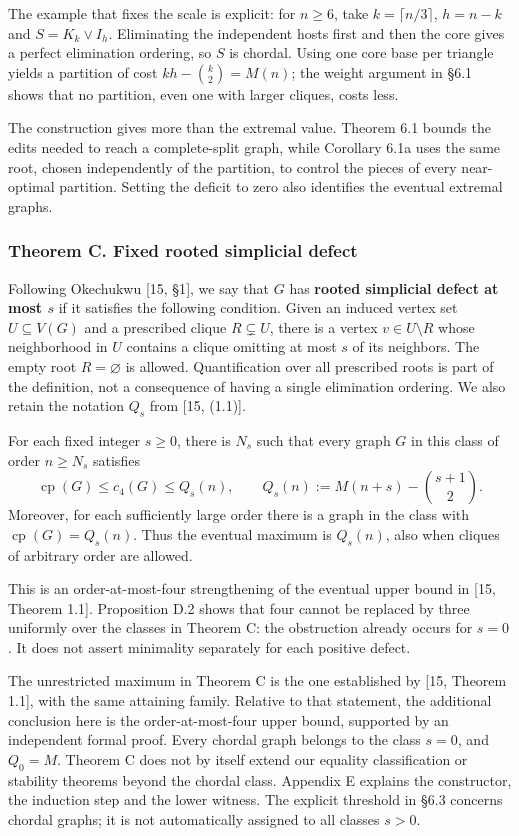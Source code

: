 \documentclass[english,11pt,a4paper]{article}
\begin{document}
The example that fixes the scale is explicit: for \(n\ge6\), take \(k=\lceil n/3\rceil\), \(h=n-k\) and \(S=K_k\vee I_h\). Eliminating the independent hosts first and then the core gives a perfect elimination ordering, so \(S\) is chordal. Using one core base per triangle yields a partition of cost \(kh-\binom k2=M(n)\); the weight argument in §6.1 shows that no partition, even one with larger cliques, costs less.

The construction gives more than the extremal value. Theorem 6.1 bounds the edits needed to reach a complete-split graph, while Corollary 6.1a uses the same root, chosen independently of the partition, to control the pieces of every near-optimal partition. Setting the deficit to zero also identifies the eventual extremal graphs.

\subsubsection{Theorem C. Fixed rooted simplicial defect}\label{theorem-c.-fixed-rooted-simplicial-defect}

Following Okechukwu {[}15, §1{]}, we say that \(G\) has \textbf{rooted simplicial defect at most \(s\)} if it satisfies the following condition. Given an induced vertex set \(U\subseteq V(G)\) and a prescribed clique \(R\subsetneq U\), there is a vertex \(v\in U\setminus R\) whose neighborhood in \(U\) contains a clique omitting at most \(s\) of its neighbors. The empty root \(R=\varnothing\) is allowed. Quantification over all prescribed roots is part of the definition, not a consequence of having a single elimination ordering. We also retain the notation \(Q_s\) from {[}15, (1.1){]}.

For each fixed integer \(s\ge0\), there is \(N_s\) such that every graph \(G\) in this class of order \(n\ge N_s\) satisfies \[
\operatorname{cp}(G)\le c_4(G)\le Q_s(n),
\qquad
Q_s(n):=M(n+s)-\binom{s+1}{2}.
\tag{C}
\] Moreover, for each sufficiently large order there is a graph in the class with \(\operatorname{cp}(G)=Q_s(n)\). Thus the eventual maximum is \(Q_s(n)\), also when cliques of arbitrary order are allowed.

This is an order-at-most-four strengthening of the eventual upper bound in {[}15, Theorem 1.1{]}. Proposition D.2 shows that four cannot be replaced by three uniformly over the classes in Theorem C: the obstruction already occurs for \(s=0\). It does not assert minimality separately for each positive defect.

The unrestricted maximum in Theorem C is the one established by {[}15, Theorem 1.1{]}, with the same attaining family. Relative to that statement, the additional conclusion here is the order-at-most-four upper bound, supported by an independent formal proof. Every chordal graph belongs to the class \(s=0\), and \(Q_0=M\). Theorem C does not by itself extend our equality classification or stability theorems beyond the chordal class. Appendix E explains the constructor, the induction step and the lower witness. The explicit threshold in §6.3 concerns chordal graphs; it is not automatically assigned to all classes \(s>0\).
\end{document}
